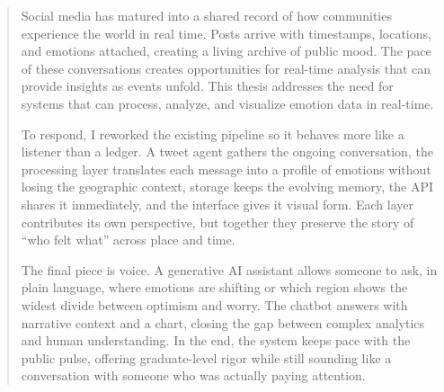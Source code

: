 \documentclass[
12pt, 
english,
onehalfspacing,
headsepline,
]{MastersDoctoralThesis}
\begin{document}
\begin{singlespacing}

\begin{abstract}
\addchaptertocentry{\abstractname} 

Social media has matured into a shared record of how communities experience the world in real time. Posts arrive with timestamps, locations, and emotions attached, creating a living archive of public mood. The pace of these conversations creates opportunities for real-time analysis that can provide insights as events unfold. This thesis addresses the need for systems that can process, analyze, and visualize emotion data in real-time.

To respond, I reworked the existing pipeline so it behaves more like a listener than a ledger. A tweet agent gathers the ongoing conversation, the processing layer translates each message into a profile of emotions without losing the geographic context, storage keeps the evolving memory, the API shares it immediately, and the interface gives it visual form. Each layer contributes its own perspective, but together they preserve the story of ``who felt what'' across place and time.

The final piece is voice. A generative AI assistant allows someone to ask, in plain language, where emotions are shifting or which region shows the widest divide between optimism and worry. The chatbot answers with narrative context and a chart, closing the gap between complex analytics and human understanding. In the end, the system keeps pace with the public pulse, offering graduate-level rigor while still sounding like a conversation with someone who was actually paying attention.

\end{abstract}

\end{singlespacing}


\tableofcontents

\listoffigures


\mainmatter
\end{document}
